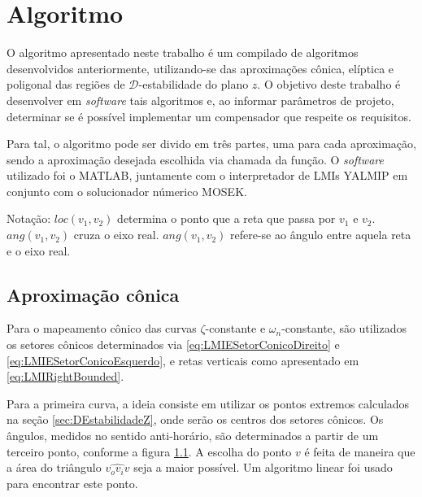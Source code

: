 \chapter{Algoritmo}

O algoritmo apresentado neste trabalho é um compilado de algoritmos desenvolvidos anteriormente, utilizando-se das aproximações cônica, elíptica e poligonal das regiões de $\mathscr{D}$-estabilidade do plano $z$. O objetivo deste trabalho é desenvolver em \emph{software} tais algoritmos e, ao informar parâmetros de projeto, determinar se é possível implementar um compensador que respeite os requisitos.

Para tal, o algoritmo pode ser divido em três partes, uma para cada aproximação, sendo a aproximação desejada escolhida via chamada da função. O \emph{software} utilizado foi o MATLAB, juntamente com o interpretador de LMIs YALMIP em conjunto com o solucionador númerico MOSEK.

Notação: $loc(v_1, v_2)$ determina o ponto que a reta que passa por $v_1$ e $v_2$. $ang(v_1, v_2)$ cruza o eixo real. $ang(v_1, v_2)$ refere-se ao ângulo entre aquela reta e o eixo real. 

\section{Aproximação cônica}
Para o mapeamento cônico das curvas $\zeta$-constante e $\omega_n$-constante, são utilizados os setores cônicos determinados via \eqref{eq:LMIESetorConicoDireito} e \eqref{eq:LMIESetorConicoEsquerdo}, e retas verticais como apresentado em \ref{eq:LMIRightBounded}.

Para a primeira curva, a ideia consiste em utilizar os pontos extremos calculados na seção \ref{sec:DEstabilidadeZ}, onde serão os centros dos setores cônicos. Os ângulos, medidos no sentido anti-horário, são determinados a partir de um terceiro ponto, conforme a figura \ref{subfig:AproximacaoConicaZeta}. A escolha do ponto $v$ é feita de maneira que a área do triângulo $\widehat{v_ov_iv}$ seja a maior possível. Um algoritmo linear foi usado para encontrar este ponto.

\begin{figure}[!hb]
  \centering
  \begin{subfigure}[t]{0.4\columnwidth}
      
      \caption{}
      \label{subfig:AproximacaoConicaZeta}
  \end{subfigure}
  \begin{subfigure}[t]{0.4\columnwidth}
      
      \caption{}
      \label{subfig:AproximacaoConicaWn}
  \end{subfigure}
  \caption{}
  \label{fig:AproximacoesConica}
\end{figure}

